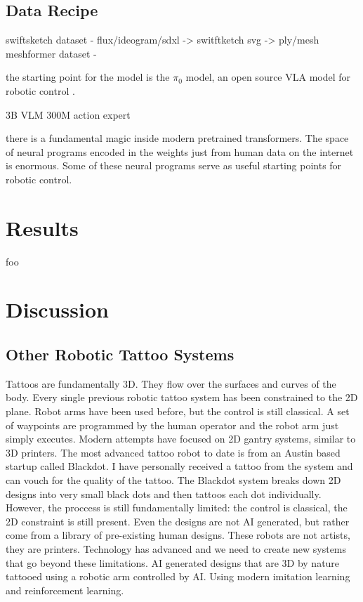 \documentclass[11pt]{article}
\begin{document}
\subsection{Data Recipe}

swiftsketch dataset - flux/ideogram/sdxl -> switftketch svg -> ply/mesh
meshformer dataset -

the starting point for the model is the $\pi_0$ model, an open source VLA model for robotic control \cite{Black2024pi0}.

3B VLM
300M action expert

there is a fundamental magic inside modern pretrained transformers.
The space of neural programs encoded in the weights just from human data on the internet is enormous. 
Some of these neural programs serve as useful starting points for robotic control.

\section{Results}

foo

\section{Discussion}

\subsection{Other Robotic Tattoo Systems}

Tattoos are fundamentally 3D.
They flow over the surfaces and curves of the body.
Every single previous robotic tattoo system has been constrained to the 2D plane.
Robot arms have been used before, but the control is still classical.
A set of waypoints are programmed by the human operator and the robot arm just simply executes.
Modern attempts have focused on 2D gantry systems, similar to 3D printers.
The most advanced tattoo robot to date is from an Austin based startup called Blackdot.
I have personally received a tattoo from the system and can vouch for the quality of the tattoo.
The Blackdot system breaks down 2D designs into very small black dots and then tattoos each dot individually.
However, the proccess is still fundamentally limited: the control is classical, the 2D constraint is still present.
Even the designs are not AI generated, but rather come from a library of pre-existing human designs.
These robots are not artists, they are printers.
Technology has advanced and we need to create new systems that go beyond these limitations.
AI generated designs that are 3D by nature tattooed using a robotic arm controlled by AI.
Using modern imitation learning and reinforcement learning.
\end{document}

